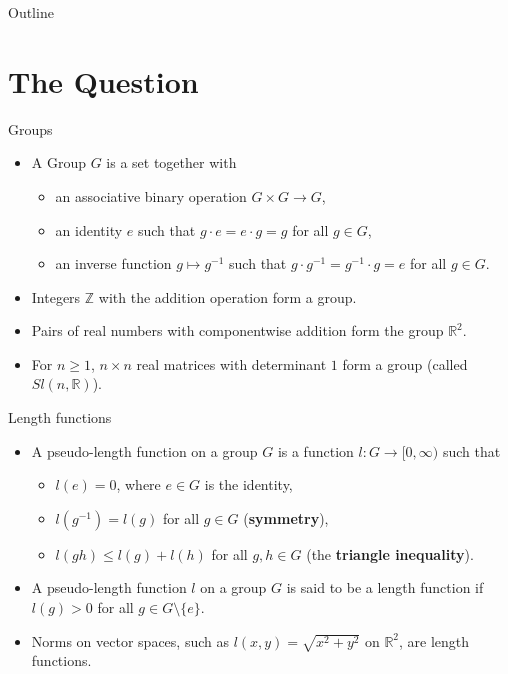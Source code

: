 \documentclass[aspectratio=1610,17pt, ucs]{beamer}
\newcommand{\Z}{\mathbb{Z}}
\newcommand{\R}{\mathbb{R}}
\begin{document}
\begin{frame}{Outline}
  \pause
  \tableofcontents[pausesections]
\end{frame}




\section{The Question}


\begin{frame}{Groups}
  \begin{itemize}[<+->]
    \item A Group $G$ is a set together with 
    \begin{itemize}
      \item an \alert{associative} binary operation $G \times G \to G$,
      \item an \alert{identity} $e$ such that $g \cdot e = e \cdot g = g$ for all $g \in G$,
      \item an \alert{inverse} function $g \mapsto g^{-1}$ such that $g \cdot g^{-1} = g^{-1} \cdot g = e$ for all $g\in G$.
    \end{itemize}
    \item Integers $\Z$ with the addition operation form a group.
    \item Pairs of real numbers with componentwise addition form the group $\R^2$.
    \item For $n\geq 1$, $n \times n$ real matrices with determinant $1$ form a group (called $Sl(n, \R)$).
  \end{itemize}

\end{frame}

\begin{frame}{Length functions}

  \begin{itemize}[<+->]
    \item A \alert{pseudo-length function} on a group $G$ is a function $l: G \to [0, \infty)$ such that
    \begin{itemize}
      \item $l(e) = 0$, where $e\in G$ is the identity,
      \item $l(g^{-1}) = l(g)$ for all $g \in G$ (\textbf{symmetry}),
      \item $l(gh) \leq l(g) + l(h)$ for all $g,h\in G$ (the \textbf{triangle inequality}).
    \end{itemize}
    \item A pseudo-length function $l$ on a group $G$ is said to be a \alert{length function} if $l(g) > 0$ for all $g\in G \setminus \{ e \}$.
    \item Norms on vector spaces, such as $l(x, y) = \sqrt{x^2 + y^2}$ on $\R^2$, are length functions. 
  \end{itemize}

\end{frame}
\end{document}
